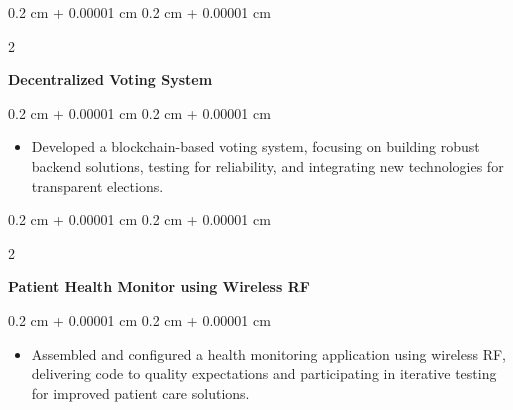 \documentclass[10pt, letterpaper]{article}
\newenvironment{highlights}{
    \begin{itemize}[
        topsep=0.10 cm,
        parsep=0.10 cm,
        partopsep=0pt,
        itemsep=0pt,
        leftmargin=0.4 cm + 10pt
    ]
}{
    \end{itemize}
} %
\newenvironment{onecolentry}{
    \begin{adjustwidth}{
        0.2 cm + 0.00001 cm
    }{
        0.2 cm + 0.00001 cm
    }
}{
    \end{adjustwidth}
} %
\newenvironment{twocolentry}[2][]{
    \onecolentry
    \def\secondColumn{#2}
    \setcolumnwidth{\fill, 4.5 cm}
    \begin{paracol}{2}
}{
    \switchcolumn \raggedleft \secondColumn
    \end{paracol}
    \endonecolentry
} %
\begin{document}
    \vspace{0.2 cm}
    \begin{twocolentry}{}
        \textbf{Decentralized Voting System}
    \end{twocolentry}
    \vspace{0.10 cm}
    \begin{onecolentry}
        \begin{highlights}
            \item Developed a blockchain-based voting system, focusing on building robust backend solutions, testing for reliability, and integrating new technologies for transparent elections.
        \end{highlights}
    \end{onecolentry}

    \vspace{0.2 cm}
    \begin{twocolentry}{}
        \textbf{Patient Health Monitor using Wireless RF}
    \end{twocolentry}
    \vspace{0.10 cm}
    \begin{onecolentry}
        \begin{highlights}
            \item Assembled and configured a health monitoring application using wireless RF, delivering code to quality expectations and participating in iterative testing for improved patient care solutions.
        \end{highlights}
    \end{onecolentry}
\end{document}
